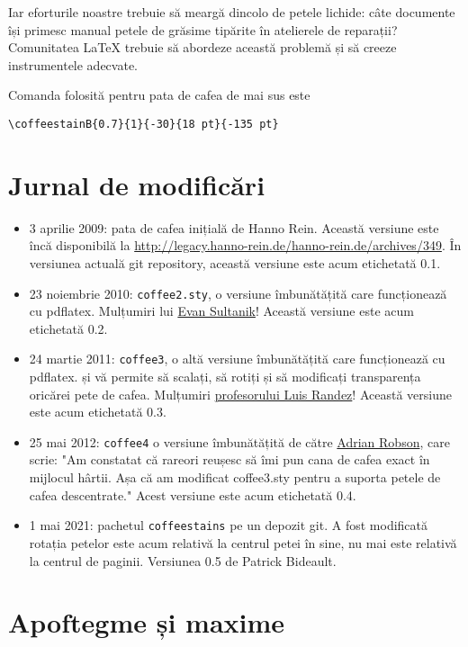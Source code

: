 \documentclass[a4paper, 11pt, BCOR = 0 pt, oneside]{scrartcl}
\begin{document}
Iar eforturile noastre trebuie să meargă dincolo de petele lichide: câte
documente își primesc manual petele de grăsime tipărite în atelierele de
reparații? Comunitatea \LaTeX{} trebuie să abordeze această problemă și să
creeze instrumentele adecvate.

\vfill{}

\begin{tcolorbox}
Comanda folosită pentru pata de cafea de mai sus este

  \verb|\coffeestainB{0.7}{1}{-30}{18 pt}{-135 pt}|
\end{tcolorbox}
\newpage{}
\section{Jurnal de modificări}
\begin{itemize}
\item 3 aprilie 2009: pata de cafea inițială de Hanno Rein. Această versiune
  este încă disponibilă la
  \url{http://legacy.hanno-rein.de/hanno-rein.de/archives/349}. În versiunea
  actuală git repository, această versiune este acum etichetată 0.1.
\item 23 noiembrie 2010: \texttt{coffee2.sty}, o versiune îmbunătățită care
  funcționează cu pdflatex. Mulțumiri lui \href{http://www.sultanik.com/}{Evan
    Sultanik}! Această versiune este acum etichetată 0.2.
\item 24 martie 2011: \texttt{coffee3}, o altă versiune îmbunătățită care funcționează cu pdflatex.
și vă permite să scalați, să rotiți și să modificați transparența oricărei pete de cafea.
Mulțumiri \href{http://pcmap.unizar.es/~pilar/}{profesorului Luis
    Randez}! Această versiune este acum etichetată 0.3.
\item 25 mai 2012: \texttt{coffee4} o versiune îmbunătățită de către
  \href{http://nepsweb.co.uk/homeapr/}{Adrian Robson}, care scrie: "Am constatat
  că rareori reușesc să îmi pun cana de cafea exact în mijlocul hârtii. Așa că
  am modificat coffee3.sty pentru a suporta petele de cafea descentrate." Acest
  versiune este acum etichetată 0.4.
\item 1 mai 2021: pachetul \texttt{coffeestains} pe un depozit git. A fost
  modificată rotația petelor este acum relativă la centrul petei în sine, nu mai
  este relativă la centrul de paginii. Versiunea 0.5 de Patrick Bideault.
\end{itemize}
\label{stainC}

\section{Apoftegme și maxime}
\end{document}
